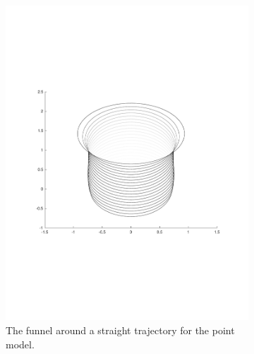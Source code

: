 \begin{figure}
  \begin{subfigure}{0.5\textwidth}
    \includegraphics[trim={2cm 5cm 0cm 5cm},
    width=\textwidth]{figures/experiments/unexpanded-funnel}
    \caption{The funnel around a straight trajectory for the point
      model.\newline}
  \end{subfigure}%
  \;
  \begin{subfigure}{0.5\textwidth}

\end{subfigure}
\end{figure}
